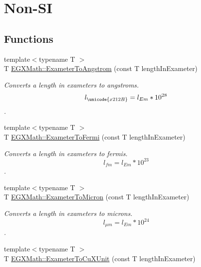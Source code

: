 \hypertarget{group___e_g_x_math-_conversions-_length_conversions-_exameter-_non-_s_i}{}\section{Non-\/\+SI}
\label{group___e_g_x_math-_conversions-_length_conversions-_exameter-_non-_s_i}
\subsection*{Functions}
\begin{DoxyCompactItemize}
\item 
{\footnotesize template$<$typename T $>$ }\\T \mbox{\hyperlink{group___e_g_x_math-_conversions-_length_conversions-_exameter-_non-_s_i_ga24d2ee057470ce37f99d31451e010a22}{E\+G\+X\+Math\+::\+Exameter\+To\+Angstrom}} (const T length\+In\+Exameter)
\begin{DoxyCompactList}\small\item\em Converts a length in exameters to angstroms. \[ l_{\unicode{x212B}}=l_{Em} * 10^{28} \]. \end{DoxyCompactList}\item 
{\footnotesize template$<$typename T $>$ }\\T \mbox{\hyperlink{group___e_g_x_math-_conversions-_length_conversions-_exameter-_non-_s_i_ga0aa0524461cbce1fcc102b847545d212}{E\+G\+X\+Math\+::\+Exameter\+To\+Fermi}} (const T length\+In\+Exameter)
\begin{DoxyCompactList}\small\item\em Converts a length in exameters to fermis. \[ l_{fm}=l_{Em} * 10^{23} \]. \end{DoxyCompactList}\item 
{\footnotesize template$<$typename T $>$ }\\T \mbox{\hyperlink{group___e_g_x_math-_conversions-_length_conversions-_exameter-_non-_s_i_ga3356bb6585e02757a196b299c29660c1}{E\+G\+X\+Math\+::\+Exameter\+To\+Micron}} (const T length\+In\+Exameter)
\begin{DoxyCompactList}\small\item\em Converts a length in exameters to microns. \[ l_{\mu m}=l_{Em} * 10^{24} \]. \end{DoxyCompactList}\item 
{\footnotesize template$<$typename T $>$ }\\T \mbox{\hyperlink{group___e_g_x_math-_conversions-_length_conversions-_exameter-_non-_s_i_gacb2c9fea6b2c2d12ee485f378f5a6af0}{E\+G\+X\+Math\+::\+Exameter\+To\+Cu\+X\+Unit}} (const T length\+In\+Exameter)

\end{DoxyCompactItemize}
